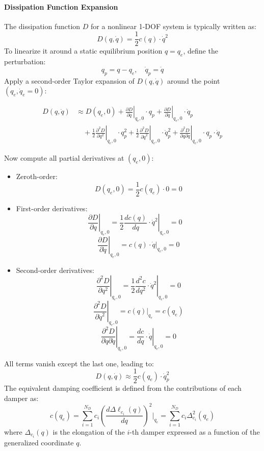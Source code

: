 \paragraph{Dissipation Function Expansion}

The dissipation function \( D \) for a nonlinear 1-DOF system is typically written as:
\[
D(q, \dot{q}) = \frac{1}{2} c(q) \cdot \dot{q}^2
\]
To linearize it around a static equilibrium position \( q = q_e \), define the perturbation:
\[
q_p = q - q_e, \quad \dot{q}_p = \dot{q}
\]
Apply a second-order Taylor expansion of \( D(q, \dot{q}) \) around the point \( (q_e, \dot{q}_e = 0) \):

\begin{align*}
D(q, \dot{q}) &\approx D(q_e, 0)
+ \left. \frac{\partial D}{\partial q} \right|_{q_e,0} \cdot q_p
+ \left. \frac{\partial D}{\partial \dot{q}} \right|_{q_e,0} \cdot \dot{q}_p \\
&\quad + \frac{1}{2} \left. \frac{\partial^2 D}{\partial q^2} \right|_{q_e,0} \cdot q_p^2
+ \frac{1}{2} \left. \frac{\partial^2 D}{\partial \dot{q}^2} \right|_{q_e,0} \cdot \dot{q}_p^2
+ \left. \frac{\partial^2 D}{\partial q \partial \dot{q}} \right|_{q_e,0} \cdot q_p \cdot \dot{q}_p
\end{align*}

Now compute all partial derivatives at \( (q_e, 0) \):

\begin{itemize}
    \item Zeroth-order:
    \[
    D(q_e, 0) = \frac{1}{2} c(q_e) \cdot 0 = 0
    \]
    \item First-order derivatives:
    \[
    \left. \frac{\partial D}{\partial q} \right|_{q_e,0}
    = \left. \frac{1}{2} \frac{d c(q)}{d q} \cdot \dot{q}^2 \right|_{q_e,0} = 0
    \quad
    \]
    \[
    \left. \frac{\partial D}{\partial \dot{q}} \right|_{q_e,0}
    = \left. c(q) \cdot \dot{q} \right|_{q_e,0} = 0
    \]
    \item Second-order derivatives:
    \[
    \left. \frac{\partial^2 D}{\partial q^2} \right|_{q_e,0}
    = \left. \frac{1}{2} \frac{d^2 c}{d q^2} \cdot \dot{q}^2 \right|_{q_e,0} = 0
    \]
    \[
    \left. \frac{\partial^2 D}{\partial \dot{q}^2} \right|_{q_e,0}
    = \left. c(q) \right|_{q_e} = c(q_e)
    \]
    \[
    \left. \frac{\partial^2 D}{\partial q \partial \dot{q}} \right|_{q_e,0}
    = \left. \frac{d c}{d q} \cdot \dot{q} \right|_{q_e,0} = 0
    \]
\end{itemize}

All terms vanish except the last one, leading to:
\[
D(q, \dot{q}) \approx \frac{1}{2} c(q_e) \cdot \dot{q}_p^2
\]
The equivalent damping coefficient is defined from the contributions of each damper as:
\[
c(q_e) = \sum_{i=1}^{N_D} c_i \left( \frac{d \Delta \ell_{c_i}(q)}{d q} \right)^2 \Bigg|_{q_e}
= \sum_{i=1}^{N_D} c_i \Delta_{c_i}^2(q_e)
\]
where \( \Delta_{c_i}(q) \) is the elongation of the \( i \)-th damper expressed as a function of the generalized coordinate \( q \).

